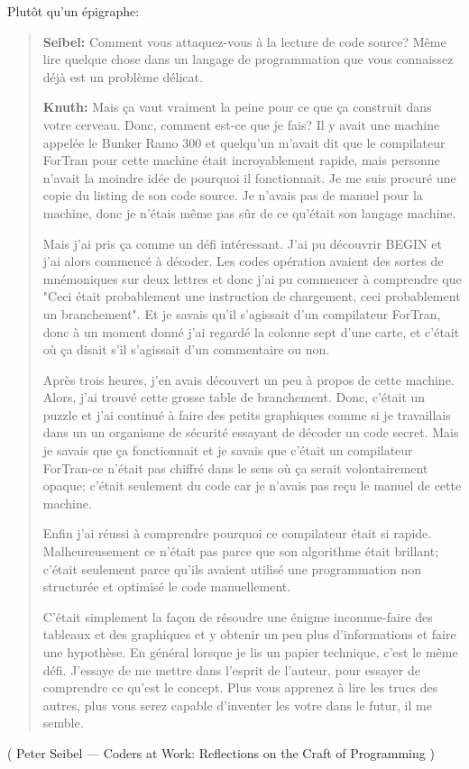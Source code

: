 Plutôt qu'un épigraphe:

\begin{framed}
\begin{quotation}

\textbf{Seibel:} Comment vous attaquez-vous à la lecture de code source? Même lire
quelque chose dans un langage de programmation que vous connaissez déjà est un problème
délicat.

\textbf{Knuth:} Mais ça vaut vraiment la peine pour ce que ça construit dans votre
cerveau. Donc, comment est-ce que je fais? Il y avait une machine appelée le Bunker
Ramo 300 et quelqu'un m'avait dit que le compilateur ForTran pour cette machine était
incroyablement rapide, mais personne n'avait la moindre idée de pourquoi il fonctionnait.
Je me suis procuré une copie du listing de son code source. Je n'avais pas de manuel
pour la machine, donc je n'étais même pas sûr de ce qu'était son langage machine.

Mais j'ai pris ça comme un défi intéressant. J'ai pu découvrir BEGIN et j'ai alors
commencé à décoder. Les codes opération avaient des sortes de mnémoniques sur deux
lettres et donc j'ai pu commencer à comprendre que "Ceci était probablement une
instruction de chargement, ceci probablement un branchement". Et je savais qu'il
s'agissait d'un compilateur ForTran, donc à un moment donné j'ai regardé la colonne
sept d'une carte, et c'était où ça disait s'il s'agissait d'un commentaire
ou non.

Après trois heures, j'en avais découvert un peu à propos de cette machine. Alors,
j'ai trouvé cette grosse table de branchement. Donc, c'était un puzzle et j'ai continué
à faire des petits graphiques comme si je travaillais dans un un organisme de sécurité
essayant de décoder un code secret. Mais je savais que ça fonctionnait et je savais
que c'était un compilateur ForTran-ce n'était pas chiffré dans le sens où ça serait
volontairement opaque; c'était seulement du code car je n'avais pas reçu le manuel
de cette machine.

Enfin j'ai réussi à comprendre pourquoi ce compilateur était si rapide.
Malheureusement ce n'était pas parce que son algorithme était brillant; c'était
seulement parce qu'ils avaient utilisé une programmation non structurée et optimisé
le code manuellement. 

C'était simplement la façon de résoudre une énigme inconnue-faire des tableaux et
des graphiques et y obtenir un peu plus d'informations et faire une hypothèse. En
général lorsque je lis un papier technique, c'est le même défi. J'essaye de me mettre
dans l'esprit de l'auteur, pour essayer de comprendre ce qu'est le concept. Plus
vous apprenez à lire les trucs des autres, plus vous serez capable d'inventer les
votre dans le futur, il me semble.

\end{quotation}
\end{framed}

( Peter Seibel --- Coders at Work: Reflections on the Craft of Programming )
